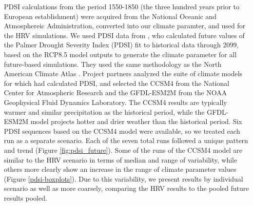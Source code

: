 \documentclass[12pt]{article}
\begin{document}
\begin{spacing}{1}
PDSI calculations from the period 1550-1850 (the three hundred years prior to European establishment) were acquired from the National Oceanic and Atmosphereic Administration, converted into our climate paramter, and used for the HRV simulations. %
We used PDSI data from \citet{Cook2014}, who calculated future values of the Palmer Drought Severity Index (PDSI) fit to historical data through 2099, based on the RCP8.5 model outputs to generate the climate parameter for all future-based simulations. They used the same methodology as the North American Climate Atlas \citep{Cook2004}. Project partners analyzed the suite of climate models for which \citet{Cook2014} had calculated PDSI, and selected the CCSM4 from the National Center for Atmospheric Research and the GFDL-ESM2M from the NOAA Geophysical Fluid Dynamics Laboratory. The CCSM4 results are typically warmer and similar precipitation as the historical period, while the GFDL-ESM2M model projects hotter and drier weather than the historical period. Six PDSI sequences based on the CCSM4 model were available, so we treated each run as a separate scenario. Each of the seven total runs followed a unique pattern and trend (Figure \ref{fig:pdsi_future}). Some of the runs of the CCSM4 model are similar to the HRV scenario in terms of median and range of variability, while others more clearly show an increase in the range of climate parameter values (Figure \ref{pdsi-boxplots}). Due to this variability, we present results by individual scenario as well as more coarsely, comparing the HRV results to the pooled future results pooled. 




\end{spacing}
\end{document}
